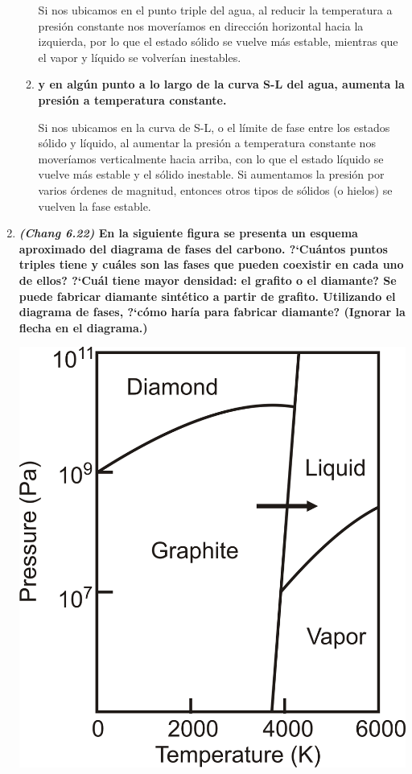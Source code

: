 \documentclass[a4paper,12pt]{article}
\begin{document}
\begin{enumerate}
\begin{enumerate}
Si nos ubicamos en el punto triple del agua, al reducir la temperatura a presi\'on constante nos mover\'iamos en direcci\'on horizontal hacia la izquierda, por lo que el estado s\'olido se vuelve m\'as estable, mientras que el vapor y l\'iquido se volver\'ian inestables.

  \item \textbf{y en alg\'un punto a lo largo de la curva S-L del agua, aumenta la presi\'on a temperatura constante.}

Si nos ubicamos en la curva de S-L, o el l\'imite de fase entre los estados s\'olido y l\'iquido, al aumentar la presi\'on a temperatura constante nos mover\'iamos verticalmente hacia arriba, con lo que el estado l\'iquido se vuelve m\'as estable y el s\'olido inestable. Si aumentamos la presi\'on por varios \'ordenes de magnitud, entonces otros tipos de s\'olidos (o hielos) se vuelven la fase estable.

 \end{enumerate} %

 \item \textbf{\textit{(Chang 6.22)} En la siguiente figura se presenta un esquema aproximado del diagrama de fases del carbono. ?`Cu\'antos puntos triples tiene y cu\'ales son las fases que pueden coexistir en cada uno de ellos? ?`Cu\'al tiene mayor densidad: el grafito o el diamante? Se puede fabricar diamante sint\'etico a partir de grafito. Utilizando el diagrama de fases, ?`c\'omo har\'ia para fabricar diamante? (Ignorar la flecha en el diagrama.)}
\begin{center}
 \includegraphics[scale=0.6]{figure4}
\end{center} %


\end{enumerate}
\end{document}
